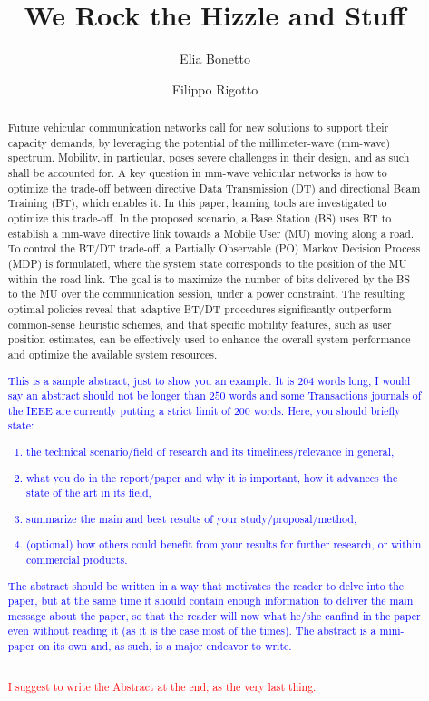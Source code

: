 \documentclass[10pt, conference, letterpaper]{IEEEtran}
\title{We Rock the Hizzle and Stuff}
\author{Elia Bonetto \and Filippo Rigotto}
\newcommand\MR[1]{\textcolor{blue}{#1}}
\newcommand\red[1]{\textcolor{red}{#1}}
\begin{document}
\maketitle

\begin{abstract}
Future vehicular communication networks call for new solutions to support their capacity demands, by leveraging the potential of the \mbox{millimeter-wave} (\mbox{mm-wave}) spectrum. Mobility, in particular, poses severe challenges in their design, and as such shall be accounted for. A key question in \mbox{mm-wave} vehicular networks is how to optimize the \mbox{trade-off} between directive Data Transmission (DT) and directional Beam Training (BT), which enables it. In this paper, learning tools are investigated to optimize this \mbox{trade-off}. In the proposed scenario, a Base Station (BS) uses BT to establish a \mbox{mm-wave} directive link towards a Mobile User (MU) moving along a road. To control the BT/DT \mbox{trade-off}, a Partially Observable (PO) Markov Decision Process (MDP) is formulated, where the system state corresponds to the position of the MU within the road link. The goal is to maximize the number of bits delivered by the BS to the MU over the communication session, under a power constraint. The resulting optimal policies reveal that adaptive BT/DT procedures significantly outperform \mbox{common-sense} heuristic schemes, and that specific mobility features, such as user position estimates, can be effectively used to enhance the overall system performance and optimize the available system resources.\\

\MR{This is a sample abstract, just to show you an example. It is $204$ words long, I would say an abstract should not be longer than $250$ words and some Transactions journals of the IEEE are currently putting a strict limit of $200$ words. Here, you should briefly state:
\begin{enumerate}
\item the technical scenario/field of research and its timeliness/relevance in general,
\item what you do in the report/paper and why it is important, how it advances the state of the art in its field,
\item summarize the main and best results of your study/proposal/method,
\item (optional) how others could benefit from your results for further research, or within commercial products.
\end{enumerate}
The abstract should be written in a way that motivates the reader to delve into the paper, but at the same time it should contain enough information to deliver the main message about the paper, so that the reader will now what he/she canfind in the paper even without reading it (as it is the case most of the times). The abstract is a mini-paper on its own and, as such, is a major endeavor to write.}\\

\red{I suggest to write the Abstract at the end, as the very last thing.}
\end{abstract}
\end{document}
